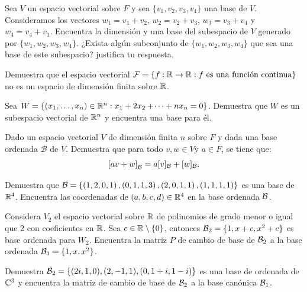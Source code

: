 \documentclass[12pt,a4paper]{book}
\newcommand{\llaves}[1]{\{#1\}}
\newcommand{\parentesis}[1]{\left(#1\right)}
\newcommand{\corchetes}[1]{\left[#1\right]}
\begin{document}
    \begin{ejercicio}
        Sea $V$ un espacio vectorial sobre $F$ y sea $\llaves{v_1, v_2, v_3, v_4}$ una base de $V$. Consideramos los vectores $w_1 = v_1 + v_2$, $w_2 = v_2 + v_3$, $w_3 = v_3 + v_4$ y $w_4 = v_4 + v_1$. Encuentra la dimensión y una base del subespacio de $V$ generado por $\llaves{w_1, w_2, w_3, w_4}$. ¿Exista algún subconjunto de $\llaves{w_1, w_2, w_3, w_4}$ que sea una base de este subespacio? justifica tu respuesta.
    \end{ejercicio}

    \begin{ejercicio}
        Demuestra que el espacio vectorial $\mathcal{F} = \llaves{f: \R \to \R : f \text{ es una función continua}}$ no es un espacio de dimensión finita sobre $\mathbb{R}$.
    \end{ejercicio}

    \begin{ejercicio}
        Sea $W = \llaves{(x_1, \dots, x_n) \in \R^n : x_1 + 2x_2 + \dotsi + nx_n = 0}$. Demuestra que $W$ es un subespacio vectorial de $\mathbb{R}^n$ y encuentra una base para él.
    \end{ejercicio}

    \begin{ejercicio}
        Dado un espacio vectorial $V$ de dimensión finita $n$ sobre $F$ y dada una base ordenada $\mathcal{B}$ de $V$. Demuestra que para todo $v, w \in V$y $a \in F$, se tiene que:
        \[
        \corchetes{av + w}_\BB = a[v]_\BB + [w]_\BB.
        \]
    \end{ejercicio}

    \begin{ejercicio}
        Demuestra que $\BB = \llaves{\parentesis{1, 2, 0, 1}, \parentesis{0, 1, 1, 3}, \parentesis{2, 0, 1, 1},(1, 1, 1, 1)}$ es una base de $\mathbb{R}^4$. Encuentra las coordenadas de $(a, b, c, d) \in \mathbb{R}^4$ en la base ordenada $\mathcal{B}$.
    \end{ejercicio}

    \begin{ejercicio}
        Considera $V_2$ el espacio vectorial sobre $\mathbb{R}$ de polinomios de grado menor o igual que 2 con coeficientes en $\mathbb{R}$. Sea $c \in \R \setminus \llaves{0}$, entonces $\BB_2 = \llaves{1, x + c, x^2 + c}$ es base ordenada para $W_2$. Encuentra la matriz $P$ de cambio de base de $\mathcal{B}_2$ a la base ordenada $\BB_1 = \llaves{1, x, x^2}$.
    \end{ejercicio}

    \begin{ejercicio}
        Demuestra $\BB_2 = \llaves{(2i, 1, 0), (2, -1, 1), (0, 1 + i, 1 - i)}$ es una base de ordenada de $\mathbb{C}^3$ y encuentra la matriz de cambio de base de $\mathcal{B}_2$ a la base canónica $\mathcal{B}_1$.
    \end{ejercicio}
\end{document}
